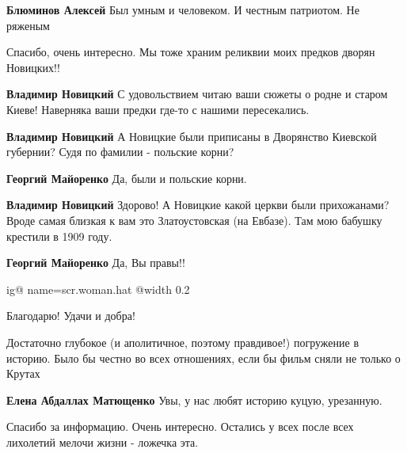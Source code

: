 \begin{itemize}
\begin{itemize}
\textbf{Блюминов Алексей} Был умным и человеком. И честным патриотом. Не ряженым
\end{itemize} %

Спасибо, очень интересно. Мы тоже храним реликвии моих предков дворян Новицких!!

\begin{itemize} %
\textbf{Владимир Новицкий} С удовольствием читаю ваши сюжеты о родне и старом Киеве! Наверняка ваши предки где-то с нашими пересекались.

\textbf{Владимир Новицкий} А Новицкие были приписаны в Дворянство Киевской губернии? Судя по фамилии - польские корни?

\begin{itemize} %
\textbf{Георгий Майоренко} Да, были и польские корни.

\textbf{Владимир Новицкий} Здорово! А Новицкие какой церкви были прихожанами? Вроде самая близкая к вам это Златоустовская (на Евбазе). Там мою бабушку крестили в 1909 году.
\end{itemize} %

\textbf{Георгий Майоренко} Да, Вы правы!!

\end{itemize} %


\ifcmt
  ig@ name=scr.woman.hat
  @width 0.2
\fi


Благодарю! Удачи и добра!


Достаточно глубокое (и аполитичное, поэтому правдивое!) погружение в историю.
Было бы честно во всех отношениях, если бы фильм сняли не только о Крутах

\begin{itemize} %
\textbf{Елена Абдаллах Матющенко} Увы, у нас любят историю куцую, урезанную.
\end{itemize} %

Спасибо за информацию. Очень интересно. Остались у всех после всех лихолетий
мелочи жизни - ложечка эта.


\end{itemize}
